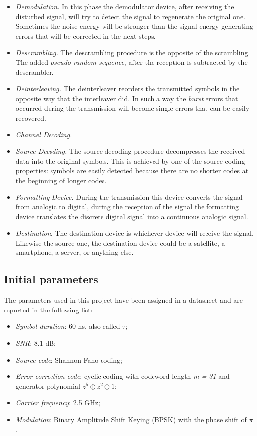 \begin{itemize}
    \item \textsl{Demodulation.} In this phase the demodulator device, after receiving the disturbed signal, will try to detect the signal to regenerate the original one. Sometimes the noise energy will be stronger than the signal energy generating errors that will be corrected in the next steps.
    \item \textsl{Descrambling.} The descrambling procedure is the opposite of the scrambling. The added \textit{pseudo-random sequence}, after the reception is subtracted by the descrambler.
    \item \textsl{Deinterleaving.} The deinterleaver reorders the transmitted symbols in the opposite way that the interleaver did. In such a way the \textit{burst} errors that occurred during the transmission will become single errors that can be easily recovered.
    \item \textsl{Channel Decoding.} 
    \item \textsl{Source Decoding.} The source decoding procedure decompresses the received data into the original symbols. This is achieved by one of the source coding properties: symbols are easily detected because there are no shorter codes at the beginning of longer codes.
    \item \textsl{Formatting Device.} During the transmission this device converts the signal from analogic to digital, during the reception of the signal the formatting device translates the discrete digital signal into a continuous analogic signal. 
    \item \textsl{Destination.} The destination device is whichever device will receive the signal. Likewise the source one, the destination device could be a satellite, a smartphone, a server, or anything else.
\end{itemize}

\subsection{Initial parameters}
The parameters used in this project have been assigned in a datasheet and are reported in the following list:
\vspace{-5px}
\begin{itemize}
    \renewcommand{\labelitemi}{$\cdot$}
    \setlength{\itemsep}{-2px}
    \item \textsl{Symbol duration}: 60 ns, also called $\tau$;
    \item \textsl{SNR}: 8.1 dB;
    \item \textsl{Source code}: Shannon-Fano coding;
    \item \textsl{Error correction code}: cyclic coding with codeword length \textit{m = 31} and generator polynomial $ z^5 \oplus z^2 \oplus 1$;
    \item \textsl{Carrier frequency}: 2.5 GHz;
    \item \textsl{Modulation}: Binary Amplitude Shift Keying (BPSK) with the phase shift of $\pi$.
\end{itemize}

